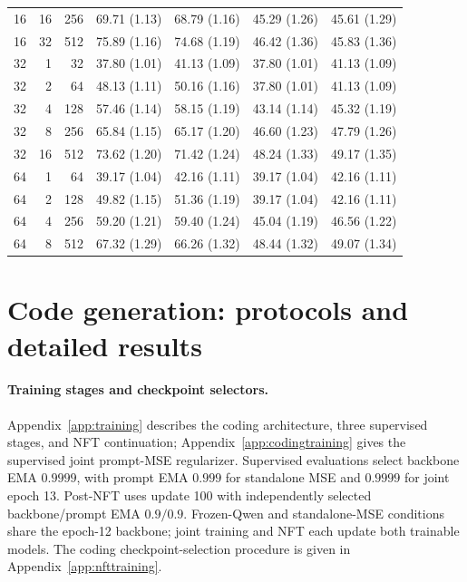 \documentclass{article}
\begin{document}
\begin{table}[!htbp]
\begin{tabular}{@{}rrr rrrr@{}}
16 & 16 & 256 & 69.71 {\scriptsize (1.13)} & 68.79 {\scriptsize (1.16)} & 45.29 {\scriptsize (1.26)} & 45.61 {\scriptsize (1.29)} \\
16 & 32 & 512 & 75.89 {\scriptsize (1.16)} & 74.68 {\scriptsize (1.19)} & 46.42 {\scriptsize (1.36)} & 45.83 {\scriptsize (1.36)} \\
\midrule
32 & 1 & 32 & 37.80 {\scriptsize (1.01)} & 41.13 {\scriptsize (1.09)} & 37.80 {\scriptsize (1.01)} & 41.13 {\scriptsize (1.09)} \\
32 & 2 & 64 & 48.13 {\scriptsize (1.11)} & 50.16 {\scriptsize (1.16)} & 37.80 {\scriptsize (1.01)} & 41.13 {\scriptsize (1.09)} \\
32 & 4 & 128 & 57.46 {\scriptsize (1.14)} & 58.15 {\scriptsize (1.19)} & 43.14 {\scriptsize (1.14)} & 45.32 {\scriptsize (1.19)} \\
32 & 8 & 256 & 65.84 {\scriptsize (1.15)} & 65.17 {\scriptsize (1.20)} & 46.60 {\scriptsize (1.23)} & 47.79 {\scriptsize (1.26)} \\
32 & 16 & 512 & 73.62 {\scriptsize (1.20)} & 71.42 {\scriptsize (1.24)} & 48.24 {\scriptsize (1.33)} & 49.17 {\scriptsize (1.35)} \\
\midrule
64 & 1 & 64 & 39.17 {\scriptsize (1.04)} & 42.16 {\scriptsize (1.11)} & 39.17 {\scriptsize (1.04)} & 42.16 {\scriptsize (1.11)} \\
64 & 2 & 128 & 49.82 {\scriptsize (1.15)} & 51.36 {\scriptsize (1.19)} & 39.17 {\scriptsize (1.04)} & 42.16 {\scriptsize (1.11)} \\
64 & 4 & 256 & 59.20 {\scriptsize (1.21)} & 59.40 {\scriptsize (1.24)} & 45.04 {\scriptsize (1.19)} & 46.56 {\scriptsize (1.22)} \\
64 & 8 & 512 & 67.32 {\scriptsize (1.29)} & 66.26 {\scriptsize (1.32)} & 48.44 {\scriptsize (1.32)} & 49.07 {\scriptsize (1.34)} \\
\bottomrule
\end{tabular}
\end{table}

\clearpage
\section{Code generation: protocols and detailed results}
\label{app:codingdetails}

\paragraph{Training stages and checkpoint selectors.}
Appendix~\ref{app:training} describes the coding architecture, three supervised stages, and NFT continuation; Appendix~\ref{app:codingtraining} gives the supervised joint prompt-MSE regularizer. Supervised evaluations select backbone EMA $0.9999$, with prompt EMA $0.999$ for standalone MSE and $0.9999$ for joint epoch 13. Post-NFT uses update 100 with independently selected backbone/prompt EMA $0.9/0.9$. Frozen-Qwen and standalone-MSE conditions share the epoch-12 backbone; joint training and NFT each update both trainable models. The coding checkpoint-selection procedure is given in Appendix~\ref{app:nfttraining}.
\end{document}
